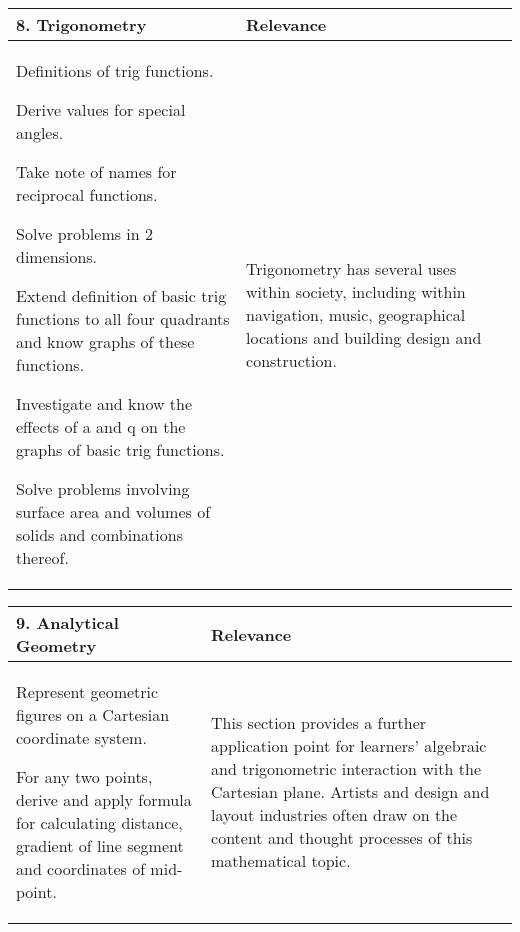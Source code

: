 \begin{table}[H]
 \begin{center} 
\begin{tabular}{|p{8.5cm}|p{3.5cm}|} \hline
\textbf{8. Trigonometry}& \textbf{Relevance}\\ \hline  

Definitions of trig functions.\par
Derive values for special angles.\par
Take note of names for reciprocal functions.\par
Solve problems in 2 dimensions.\par
Extend definition of basic trig functions to all four quadrants and know graphs of these functions.\par
Investigate and know the effects of a and q on the graphs of basic trig functions.\par
Solve problems involving surface area and volumes of solids and combinations thereof.
& Trigonometry has several uses within society, including within navigation, music, geographical locations and building design and construction.
\\ \hline

 \end{tabular}
\end{center}
\end{table}

\begin{table}[H]
 \begin{center} 
\begin{tabular}{|p{8.5cm}|p{3.5cm}|} \hline
\textbf{9. Analytical Geometry}&  \textbf{Relevance} \\ \hline  

Represent geometric figures on a Cartesian coordinate system.\par
For any two points, derive and apply formula for calculating distance, gradient of line segment and coordinates of mid-point.
& This section provides a further application point for learners’ algebraic and trigonometric interaction with the Cartesian plane. Artists and design and layout industries often draw on the content and thought processes of this mathematical topic.
\\ \hline

 \end{tabular}
\end{center}
\end{table}

